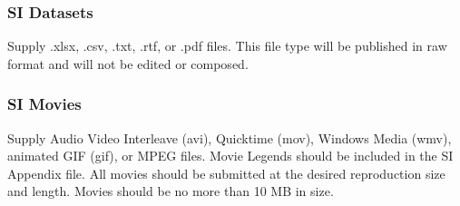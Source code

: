 \documentclass[9pt,twocolumn,twoside]{pnas-new}
\begin{document}
\subsubsection*{SI Datasets}

Supply .xlsx, .csv, .txt, .rtf, or .pdf files. This file type will be published in raw format and will not be edited or composed.


\subsubsection*{SI Movies}

Supply Audio Video Interleave (avi), Quicktime (mov), Windows Media (wmv), animated GIF (gif), or MPEG files. Movie Legends should be included in the SI Appendix file. All movies should be submitted at the desired reproduction size and length. Movies should be no more than 10 MB in size.




\showacknow %


\end{document}
